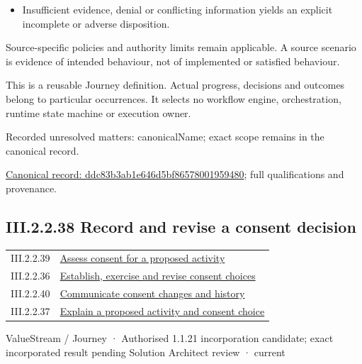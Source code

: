 \begin{itemize}


\item Insufficient evidence, denial or conflicting information yields an explicit incomplete or adverse disposition.

\end{itemize}


Source-specific policies and authority limits remain applicable. A source scenario is evidence of intended behaviour, not of implemented or satisfied behaviour.



This is a reusable Journey definition. Actual progress, decisions and outcomes belong to particular occurrences. It selects no workflow engine, orchestration, runtime state machine or execution owner.


{\small Recorded unresolved matters: canonicalName; exact scope remains in the canonical record.}\par
{\footnotesize \href{../../../../continuum/strategy/value-stream/ddc83b3ab1e646d5bf86578001959480.md}{Canonical record: ddc83b3ab1e646d5bf86578001959480}; full qualifications and provenance.}\par
\subsection*{III.2.2.38 Record and revise a consent decision}
\label{navigation:III.2.2.38}

\begin{longtable}{p{.22\linewidth}p{.73\linewidth}}
III.2.2.39 & \hyperref[element:17c66eb17d6040d09e250e787be71719]{Assess consent for a proposed activity} \\
III.2.2.36 & \hyperref[element:850bba32295c4e53b20036b80f77f491]{Establish, exercise and revise consent choices} \\
III.2.2.40 & \hyperref[element:9356b876f2aa427f989ad4f1b7f2fa4c]{Communicate consent changes and history} \\
III.2.2.37 & \hyperref[element:ddc83b3ab1e646d5bf86578001959480]{Explain a proposed activity and consent choice} \\
\end{longtable}
\label{element:74779c85619741d18053a2304457190b}
{\small ValueStream / Journey · Authorised 1.1.21 incorporation candidate; exact incorporated result pending Solution Architect review · current}\par

